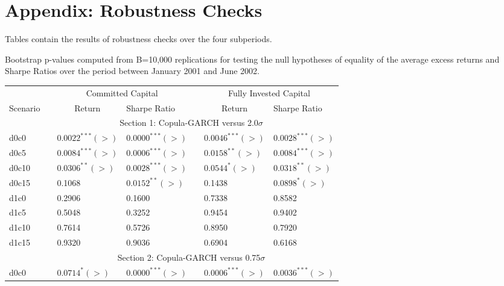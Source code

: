 \documentclass[a4paper,12pt]{report}
\begin{document}



\newpage
\section*{Appendix: Robustness Checks}

Tables contain the results of robustness checks over the four subperiods. 

\begin{threeparttable}[H]
	\centering \scriptsize
	\caption{Bootstrap p-values computed from B=10,000 replications for testing the null hypotheses of equality of the average excess returns and Sharpe Ratios over the period between January 2001 and June 2002.}
	\begin{tabularx}{\textwidth}{@{\extracolsep{\fill}}lllllll@{}}
		\toprule
		& & \multicolumn{2}{c}{Committed Capital} & \multicolumn{1}{c}{} & \multicolumn{2}{c}{Fully Invested Capital} \\
		\cmidrule{3-4}  \cmidrule{6-7}
		\multicolumn{1}{c}{Scenario} & & \multicolumn{1}{c}{Return} & Sharpe Ratio &       & \multicolumn{1}{c}{Return}& Sharpe Ratio \\
		\midrule
		& \multicolumn{6}{c}{Section 1: Copula-GARCH versus 2.0$\sigma$} \\
		\midrule
		d0c0 & & $0.0022^{***}(>)$ & $0.0000^{***}(>)$ &       & $0.0046^{***}(>)$ & $0.0028^{***}(>)$ \\
		d0c5 & & $0.0084^{***}(>)$ & $0.0006^{***}(>)$ &       & $0.0158^{**}(>)$ & $0.0084^{***}(>)$   \\
		d0c10 & & $0.0306^{**}(>)$ & $0.0028^{***}(>)$ &       & $0.0544^{*}(>)$ & $0.0318^{**}(>)$ \\
		d0c15 & & 0.1068 & $0.0152^{**}(>)$ &       & 0.1438 & $0.0898^{*}(>)$ \\
		d1c0 & & 0.2906 & 0.1600  &       & 0.7338 & 0.8582 \\
		d1c5 & & 0.5048 & 0.3252 &       & 0.9454 & 0.9402 \\
		d1c10 & & 0.7614 & 0.5726 &       & 0.8950 & 0.7920 \\
		d1c15 & & 0.9320 & 0.9036 &       & 0.6904 & 0.6168 \\
		\midrule
		& \multicolumn{6}{c}{Section 2: Copula-GARCH versus 0.75$\sigma$} \\
		\midrule
		d0c0 & & $0.0714^{*}(>)$ & $0.0000^{***}(>)$ &       & $0.0006^{***}(>)$ & $0.0036^{***}(>)$ \\

\end{tabularx}
\end{threeparttable}
\end{document}
